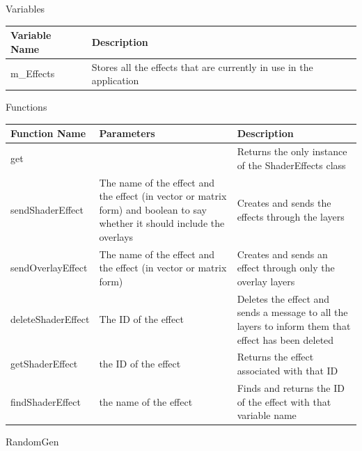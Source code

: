 \documentclass{article}
\begin{document}
                \begin{center}
                    Variables
                    \begin{tabular}{ | m{} | m{} | }
                        \hline
                        \textbf{Variable Name} & \textbf{Description} \\
                        \hline
                        m\_Effects & Stores all the effects that are currently in use in the application \\
                        \hline
                    \end{tabular}
                    Functions
                    \begin{tabular}{ | m{} | m{}| m{} | }
                        \hline
                        \textbf{Function Name} & \textbf{Parameters} & \textbf{Description} \\
                        \hline
                        get & & Returns the only instance of the ShaderEffects class \\
                        \hline
                        sendShaderEffect & The name of the effect and the effect (in vector or matrix form) and boolean to say whether it should include the overlays & Creates and sends the effects through the layers \\
                        \hline
                        sendOverlayEffect & The name of the effect and the effect (in vector or matrix form) & Creates and sends an effect through only the overlay layers \\
                        \hline
                        deleteShaderEffect & The ID of the effect & Deletes the effect and sends a message to all the layers to inform them that effect has been deleted \\
                        \hline
                        getShaderEffect & the ID of the effect & Returns the effect associated with that ID \\
                        \hline
                        findShaderEffect & the name of the effect & Finds and returns the ID of the effect with that variable name \\
                        \hline
                    \end{tabular}
                \end{center}
                RandomGen
\end{document}
